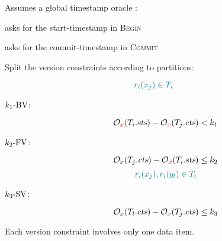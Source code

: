 \begin{frame}{}
  Assumes a global timestamp oracle :
  \begin{description}[Coordinator:]
    \item[Client:] asks for the start-timestamp in \textsc{Begin}
    \item[Coordinator:] asks for the commit-timestamp in \textsc{Commit}
  \end{description}
\end{frame}

\begin{frame}{}
  Split the \rvsi{} version constraints according to partitions:

  \[
    \textcolor{teal}{r_i(x_j) \in T_i}
  \]
  \vspace{-0.40cm}
  \begin{description}
    \item[$k_1\text{-BV}$:]
      \[
	\mathcal{O}_{\textcolor{red}{x}}(T_i.\textsl{sts}) - \mathcal{O}_{\textcolor{red}{x}}(T_j.\textsl{cts}) < k_1
      \]
    \item[$k_2\text{-FV}$:]
      \[
	\mathcal{O}_{\textcolor{red}{x}}(T_j.\textsl{cts}) - \mathcal{O}_{\textcolor{red}{x}}(T_i.\textsl{sts}) \le k_2
      \]
      \vspace{0.20cm}
      \[
	\textcolor{teal}{r_i(x_j), r_i(y_l) \in T_i}
      \]
    \item[$k_3\text{-SV}$:]
      \[
	\mathcal{O}_{\textcolor{red}{x}}(T_l.\textsl{cts}) - \mathcal{O}_{\textcolor{red}{x}}(T_j.\textsl{cts}) \le k_3
      \]
  \end{description}

  \vspace{0.6cm}
  \centerline{Each version constraint involves only one data item.}
\end{frame}
